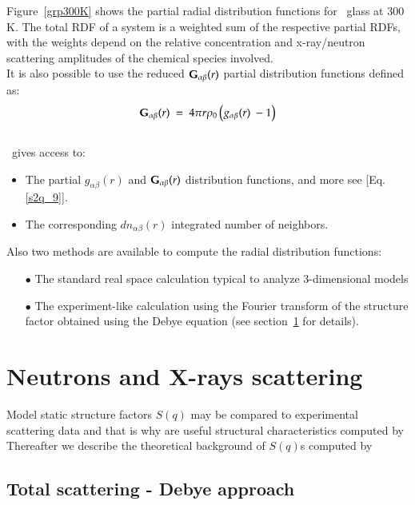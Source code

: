 \laf Figure~\ref{grp300K} shows the partial radial distribution functions for \ges\ glass at 300 K. The total RDF of a system is a weighted sum of the respective partial RDFs, with the weights depend on the relative concentration and x-ray/neutron scattering amplitudes of the chemical species involved. \\
It is also possible to use the reduced ${\bf{G}}_{\alpha\beta}(r)$ partial distribution functions defined as: 
\begin{equation}
{\bf{G}}_{\alpha\beta}(r)\ =\ 4\pi r \rho_0 \left(g_{\alpha \beta}(r)\ - 1\right)
\end{equation}
\\
\atomes\ gives access to:
\begin{itemize}
\item The partial $g_{\alpha \beta}(r)$ and ${\bf{G}}_{\alpha\beta}(r)$ distribution functions, and more see [Eq.\ref{s2q_9}].
\item The corresponding $dn_{\alpha \beta}(r)$ integrated number of neighbors. \\
\end{itemize}
Also two methods are available to compute the radial distribution functions:
\begin{itemize}
\item[$\bullet$] The standard real space calculation typical to analyze 3-dimensional models
\item[$\bullet$] The experiment-like calculation using the Fourier transform of the structure factor obtained using the Debye equation (see section~\ref{scatt} for details).
\end{itemize}
\newpage
\section{Neutrons and X-rays scattering}
\label{scatt}

Model static structure factors $S(q)$ may be compared to experimental scattering data and that is why are useful structural characteristics computed by \atomes
Thereafter we describe the theoretical background of $S(q)$s computed by \atomes

\subsection{Total scattering - Debye approach}

